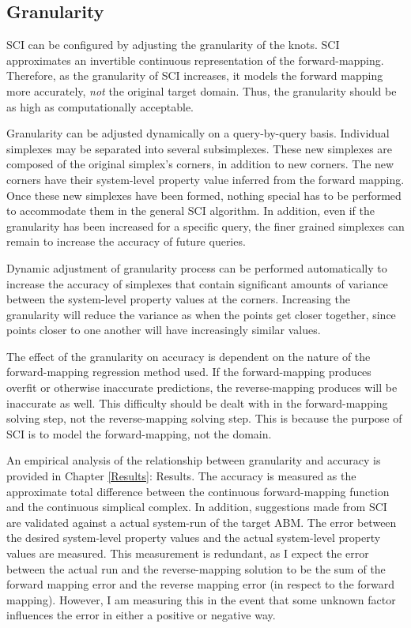 \subsection{Granularity}
\label{subsec:granularity}

SCI can be configured by adjusting the granularity of the knots.
SCI approximates an invertible continuous representation of the forward-mapping.
Therefore, as the granularity of SCI increases, it models the forward mapping more accurately, \textit{not} the original target domain.
Thus, the granularity should be as high as computationally acceptable.

Granularity can be adjusted dynamically on a query-by-query basis.
Individual simplexes may be separated into several subsimplexes.
These new simplexes are composed of the original simplex's corners, in addition to new corners.
The new corners have their system-level property value inferred from the forward mapping.
Once these new simplexes have been formed, nothing special has to be performed to accommodate them in the general SCI algorithm.
In addition, even if the granularity has been increased for a specific query, the finer grained simplexes can remain to increase the accuracy of future queries.

Dynamic adjustment of granularity process can be performed automatically to increase the accuracy of simplexes that contain significant amounts of variance between the system-level property values at the corners.
Increasing the granularity will reduce the variance as when the points get closer together, since points closer to one another will have increasingly similar values.

The effect of the granularity on accuracy is dependent on the nature of the forward-mapping regression method used.
If the forward-mapping produces overfit or otherwise inaccurate predictions, the reverse-mapping produces will be inaccurate as well.
This difficulty should be dealt with in the forward-mapping solving step, not the reverse-mapping solving step.
This is because the purpose of SCI is to model the forward-mapping, not the domain.

An empirical analysis of the relationship between granularity and accuracy is provided in Chapter \ref{Results}: Results.
The accuracy is measured as the approximate total difference between the continuous forward-mapping function and the continuous simplical complex.
In addition, suggestions made from SCI are validated against a actual system-run of the target ABM.
The error between the desired system-level property values and the actual system-level property values are measured.
This measurement is redundant, as I expect the error between the actual run and the reverse-mapping solution to be the sum of the forward mapping error and the reverse mapping error (in respect to the forward mapping).
However, I am measuring this in the event that some unknown factor influences the error in either a positive or negative way.


